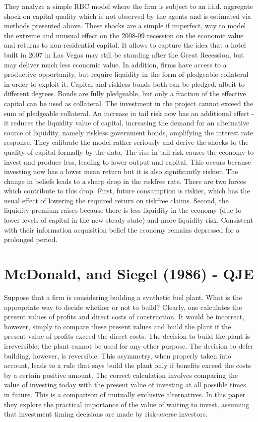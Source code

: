 \documentclass{article}
\begin{document}
{They analyze a simple RBC model where the firm is subject to an i.i.d. aggregate shock on capital quality which is not observed by the agents and is estimated via methods presented above. These shocks are a simple if imperfect, way to model the extreme and unusual effect on the 2008-09 recession on the economic value and returns to non-residential capital. It allows to capture the idea that a hotel built in 2007 in Las Vegas may still be standing after the Great Recession, but may deliver much less economic value. In addition, firms have access to a productive opportunity, but require liquidity in the form of pledgeable collateral in order to exploit it. Capital and riskless bonds both can be pledged, albeit to different degrees. Bonds are fully pledgeable, but only a fraction of the effective capital can be used as collateral. The investment in the project cannot exceed the sum of pledgeable collateral. An increase in tail risk now has an additional effect - it reduces the liquidity value of capital, increasing the demand for an alternative source of liquidity, namely riskless government bonds, amplifying the interest rate response. They calibrate the model rather seriously and derive the shocks to the quality of capital formally by the data. The rise in tail risk causes the economy to invest and produce less, leading to lower output and capital. This occurs because investing now has a lower mean return but it is also significantly riskier. The change in beliefs leads to a sharp drop in the riskfree rate. There are two forces which contribute to this drop. First, future consumption is riskier, which has the usual effect of lowering the required return on riskfree claims. Second, the liquidity premium raises because there is less liquidity in the economy (due to lower levels of capital in the new steady state) and more liquidity risk. Consistent with their information acquisition belief the economy remains depressed for a prolonged period. 


\section{McDonald, and Siegel (1986) - QJE}


Suppose that a firm is considering building a synthetic fuel plant. What is the appropriate way to decide whether or not to build? Clearly, one calculates the present values of profits and direct costs of construction. It would be incorrect, however, simply to compare these present values and build the plant if the present value of profits exceed the direct costs. The decision to build the plant is irreversible; the plant cannot be used for any other purpose. The decision to defer building, however, is reversible. This asymmetry, when properly taken into account, leads to a rule that says build the plant only if benefits exceed the costs by a certain positive amount. The correct calculation involves comparing the value of investing today with the present value of investing at all possible times in future. This is a comparison of mutually exclusive alternatives. In this paper they explore the practical importance of the value of waiting to invest, assuming that investment timing decisions are made by risk-averse investors.

}
\end{document}
